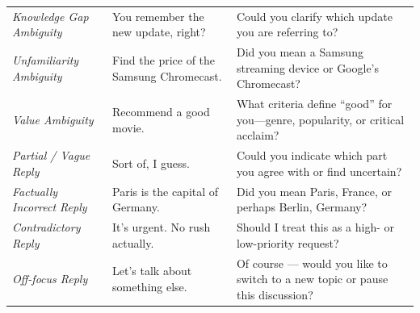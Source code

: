 \documentclass[sigconf]{acmart}
\begin{document}
\begin{table}[t]
{\begin{tabular}{p{3.5cm} p{6.5cm} p{10cm}}
\midrule

\textit{Knowledge Gap Ambiguity} & You remember the new update, right? & Could you clarify which update you are referring to? \\

\textit{Unfamiliarity Ambiguity} & Find the price of the Samsung Chromecast. & Did you mean a Samsung streaming device or Google’s Chromecast? \\

\textit{Value Ambiguity} & Recommend a good movie. & What criteria define “good” for you—genre, popularity, or critical acclaim? \\

\midrule

\textit{Partial / Vague Reply} & Sort of, I guess. & Could you indicate which part you agree with or find uncertain? \\

\textit{Factually Incorrect Reply} & Paris is the capital of Germany. & Did you mean Paris, France, or perhaps Berlin, Germany? \\

\textit{Contradictory Reply} & It’s urgent. No rush actually. & Should I treat this as a high- or low-priority request? \\

\textit{Off-focus Reply} & Let’s talk about something else. & Of course — would you like to switch to a new topic or pause this discussion? \\

\bottomrule
\end{tabular}
}
\label{tab:ambiguity-clarifications-academic}
\end{table}
\end{document}
